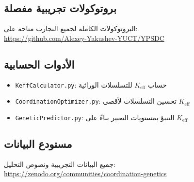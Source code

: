 \documentclass[11pt,a4paper]{article}
\begin{document}
	\subsection{بروتوكولات تجريبية مفصلة}
	
	البروتوكولات الكاملة لجميع التجارب متاحة على:\\
	\url{https://github.com/Alexey-Yakushev-YUCT/YPSDC}
	
	\subsection{الأدوات الحسابية}
	
	\begin{itemize}
		\item \texttt{KeffCalculator.py}: حساب \(K_{\text{eff}}\) للتسلسلات الوراثية
		\item \texttt{CoordinationOptimizer.py}: تحسين التسلسلات لأقصى \(K_{\text{eff}}\)
		\item \texttt{GeneticPredictor.py}: التنبؤ بمستويات التعبير بناءً على \(K_{\text{eff}}\)
	\end{itemize}
	
	\subsection{مستودع البيانات}
	
	جميع البيانات التجريبية ونصوص التحليل:\\
	\url{https://zenodo.org/communities/coordination-genetics}
	
\end{document}
